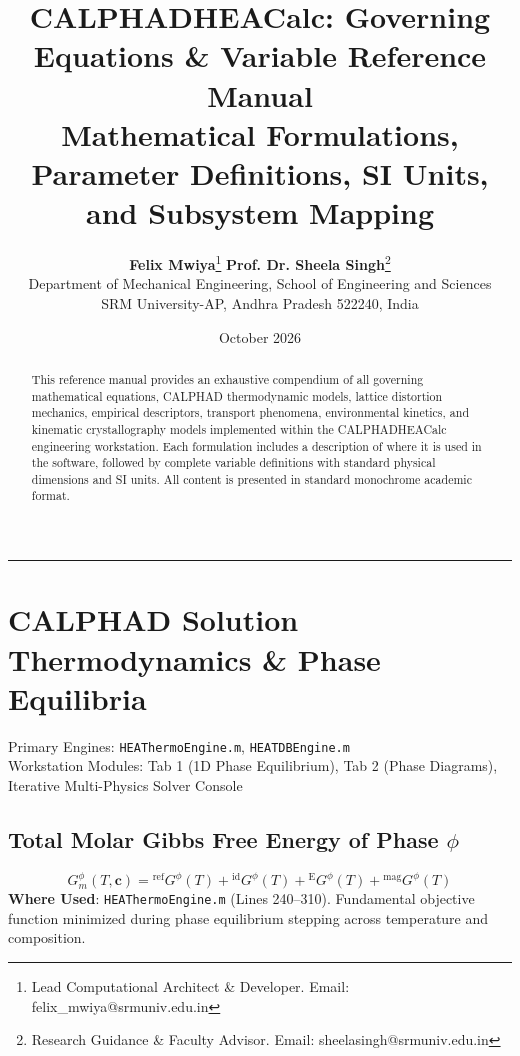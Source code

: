 \documentclass[11pt,a4paper]{article}
\title{\textbf{CALPHADHEACalc: Governing Equations \& Variable Reference Manual}\\[0.3em]
\large Mathematical Formulations, Parameter Definitions, SI Units, and Subsystem Mapping}
\author{
  \textbf{Felix Mwiya}\thanks{Lead Computational Architect \& Developer. Email: felix\_mwiya@srmuniv.edu.in} \quad 
  \textbf{Prof. Dr. Sheela Singh}\thanks{Research Guidance \& Faculty Advisor. Email: sheelasingh@srmuniv.edu.in}\\[0.4em]
  \small Department of Mechanical Engineering, School of Engineering and Sciences\\
  \small SRM University-AP, Andhra Pradesh 522240, India
}
\date{October 2026}
\begin{document}
\maketitle

\begin{abstract}
This reference manual provides an exhaustive compendium of all governing mathematical equations, CALPHAD thermodynamic models, lattice distortion mechanics, empirical descriptors, transport phenomena, environmental kinetics, and kinematic crystallography models implemented within the CALPHADHEACalc engineering workstation. Each formulation includes a description of where it is used in the software, followed by complete variable definitions with standard physical dimensions and SI units. All content is presented in standard monochrome academic format.
\end{abstract}

\tableofcontents
\vspace{1em}
\hrule
\vspace{1.5em}

\section{CALPHAD Solution Thermodynamics \& Phase Equilibria}
Primary Engines: \texttt{HEAThermoEngine.m}, \texttt{HEATDBEngine.m} \\
Workstation Modules: Tab 1 (1D Phase Equilibrium), Tab 2 (Phase Diagrams), Iterative Multi-Physics Solver Console

\subsection{Total Molar Gibbs Free Energy of Phase $\phi$}
\begin{equation}
G_m^\phi(T, \mathbf{c}) = {^{\text{ref}}}G^\phi(T) + {^{\text{id}}}G^\phi(T) + {^{\text{E}}}G^\phi(T) + {^{\text{mag}}}G^\phi(T)
\end{equation}
\textbf{Where Used}: \texttt{HEAThermoEngine.m} (Lines 240--310). Fundamental objective function minimized during phase equilibrium stepping across temperature and composition.
\end{document}
